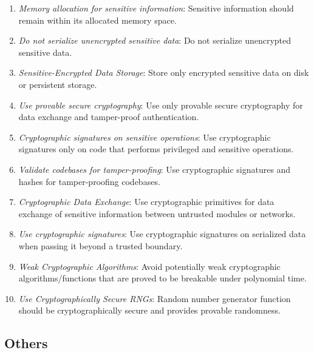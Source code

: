 \documentclass[9pt]{IEEEtran} %
\begin{document}
\begin{enumerate}
  \item \textit{Memory allocation for sensitive information}: Sensitive information should remain within its allocated memory space.
  \item \textit{Do not serialize unencrypted sensitive data}: Do not serialize unencrypted sensitive data.
  \item \textit{Sensitive-Encrypted Data Storage}: Store only encrypted sensitive data on disk or persistent storage.
  \item \textit{Use provable secure cryptography}: Use only provable secure cryptography for data exchange and tamper-proof authentication.
  \item \textit{Cryptographic signatures on sensitive operations}: Use cryptographic signatures only on code that performs privileged and sensitive operations.
  \item \textit{Validate codebases for tamper-proofing}: Use cryptographic signatures and hashes for tamper-proofing codebases.
  \item \textit{Cryptographic Data Exchange}: Use cryptographic primitives for data exchange of sensitive information between untrusted modules or networks.
  \item \textit{Use cryptographic signatures}: Use cryptographic signatures on serialized data when passing it beyond a trusted boundary.
  \item \textit{Weak Cryptographic Algorithms}: Avoid potentially weak cryptographic algorithms/functions that are proved to be breakable under polynomial time.
  \item \textit{Use Cryptographically Secure RNGs}: Random number generator function should be cryptographically secure and provides provable randomness.
\end{enumerate}

\subsection{Others}
\label{ESSOthers}
\end{document}
